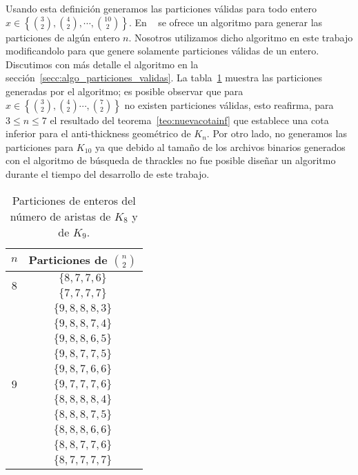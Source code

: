     Usando esta definición generamos las particiones válidas para todo entero
    $x\in \left\{ \binom{3}{2}, \binom{4}{2}, \cdots, \binom{10}{2}\right\}$.
    En ~\cite{Knuth2011} se ofrece un algoritmo para
    generar las particiones de algún entero $n$. Nosotros utilizamos
    dicho algoritmo en este trabajo modificandolo para que genere solamente
    particiones válidas de un entero. Discutimos con más detalle el algoritmo en
    la sección~\ref{secc:algo_particiones_validas}.
    La tabla~\ref{tabla:particionesk8k9} muestra las particiones generadas por el
    algoritmo; es posible observar que para $x\in \left\{\binom{3}{2},\binom{4}{2}
    \cdots,\binom{7}{2}\right\}$ no existen particiones válidas, esto reafirma,
    para $ 3\leq n\leq 7$ el resultado del teorema~\ref{teo:nuevacotainf}
    que establece una cota inferior para el anti-thickness geométrico de $K_n$. Por otro lado,
    no generamos las particiones para $K_10$ ya que debido al tamaño de los archivos binarios
    generados con el algoritmo de búsqueda de thrackles no fue posible diseñar un algoritmo durante
    el tiempo del desarrollo de este trabajo.
    \begin{table}[t]
      \centering
      \begin{tabular}{|c|c|}
        \hline
        $n$                       & Particiones de $\displaystyle\binom{n}{2}$ \\ \hline\hline
        \multirow{2}{*}{$ 8 $}    & $\{8,7,7,6\}$ \\ \cline{2-2}
                                  & $\{7,7,7,7\}$ \\ \hline
        \multirow{11}{*}{$ 9 $}   &$\{9,8,8,8,3\}$ \\ \cline{2-2}
                                  &$\{9,8,8,7,4\}$ \\ \cline{2-2}
                                  &$\{9,8,8,6,5\}$ \\ \cline{2-2}
                                  &$\{9,8,7,7,5\}$ \\ \cline{2-2}
                                  &$\{9,8,7,6,6\}$ \\ \cline{2-2}
                                  &$\{9,7,7,7,6\}$ \\ \cline{2-2}
                                  &$\{8,8,8,8,4\}$ \\ \cline{2-2}
                                  &$\{8,8,8,7,5\}$ \\ \cline{2-2}
                                  &$\{8,8,8,6,6\}$ \\ \cline{2-2}
                                  &$\{8,8,7,7,6\}$ \\ \cline{2-2}
                                  &$\{8,7,7,7,7\}$ \\ \hline
      \end{tabular}
      \caption{Particiones de enteros del número de aristas de $K_8$ y de $K_9$. }
      \label{tabla:particionesk8k9}
    \end{table}

